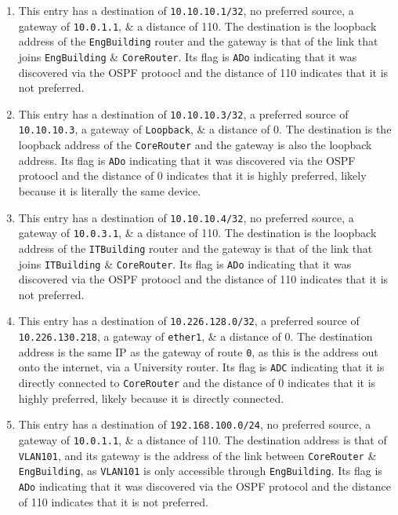 \documentclass[a4paper]{article}
\begin{document}
\begin{enumerate}
    \item   This entry has a destination of \verb|10.10.10.1/32|, no preferred source, a gateway of 
            \verb|10.0.1.1|, \& a distance of 110. 
            The destination is the loopback address of the \verb|EngBuilding| router and the gateway is that of the link 
            that joins \verb|EngBuilding| \& \verb|CoreRouter|.
            Its flag is \verb|ADo| indicating that it was discovered via the OSPF protoocl and the distance of 110
            indicates that it is not preferred.

    \item   This entry has a destination of \verb|10.10.10.3/32|, a preferred source of \verb|10.10.10.3|, a gateway of 
            \verb|Loopback|, \& a distance of 0. 
            The destination is the loopback address of the \verb|CoreRouter| and the gateway is also the loopback address.
            Its flag is \verb|ADo| indicating that it was discovered via the OSPF protoocl and the distance of 0
            indicates that it is highly preferred, likely because it is literally the same device.

    \item   This entry has a destination of \verb|10.10.10.4/32|, no preferred source, a gateway of 
            \verb|10.0.3.1|, \& a distance of 110. 
            The destination is the loopback address of the \verb|ITBuilding| router and the gateway is that of the link 
            that joins \verb|ITBuilding| \& \verb|CoreRouter|.
            Its flag is \verb|ADo| indicating that it was discovered via the OSPF protoocl and the distance of 110
            indicates that it is not preferred.

    \item   This entry has a destination of \verb|10.226.128.0/32|, a preferred source of \verb|10.226.130.218|, a
            gateway of \verb|ether1|, \& a distance of 0. 
            The destination address is the same IP as the gateway of route \verb|0|, as this is the address out onto the 
            internet, via a University router.
            Its flag is \verb|ADC| indicating that it is directly connected to \verb|CoreRouter| and the distance of 0
            indicates that it is highly preferred, likely because it is directly connected.

    \item   This entry has a destination of \verb|192.168.100.0/24|, no preferred source, a
            gateway of \verb|10.0.1.1|, \& a distance of 110. 
            The destination address is that of \verb|VLAN101|, and its gateway is the address of the link between 
            \verb|CoreRouter| \& \verb|EngBuilding|, as \verb|VLAN101| is only accessible through \verb|EngBuilding|.
            Its flag is \verb|ADo| indicating that it was discovered via the OSPF protocol and the distance of 110
            indicates that it is not preferred.


\end{enumerate}
\end{document}

